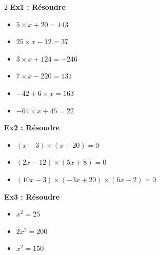 



\begin{multicols}{2}
  \textbf{Ex1 : Résoudre}
\begin{itemize}[label={$\bullet$}]
  \item $5 \times x + 20 = 143$
  \item $25 \times x - 12 = 37$
  \item $3 \times x + 124 = -246$
  \item $7 \times x - 220 = 131$
  \item $-42 + 6 \times x = 163$
  \item $-64 \times x + 45 = 22$
\end{itemize} \columnbreak

  \textbf{Ex2 : Résoudre}
\begin{itemize}[label={$\bullet$}]
  \item $(x - 3) \times (x + 20) = 0$
  \item $(2x - 12) \times (5x + 8) = 0$
  \item $(10x - 3) \times (-3x + 20) \times (6x - 2)= 0$
\end{itemize} 

  \textbf{Ex3 : Résoudre}
\begin{itemize}[label={$\bullet$}]
  \item $x^2 = 25$
  \item $2x^2 = 200$
  \item $x^2 = 150$
\end{itemize}
\end{multicols}




